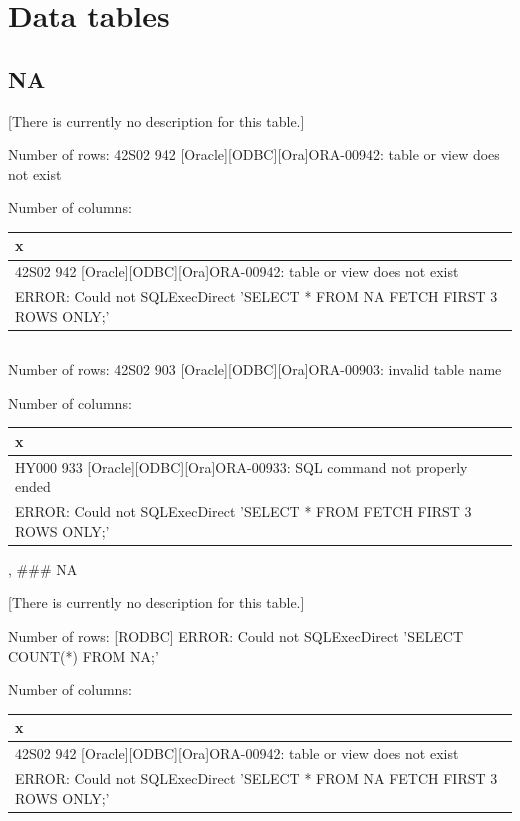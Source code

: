 \documentclass[
  letterpaper,
  oneside,
  open=any]{scrbook}
\begin{document}
\hypertarget{data-tables-1}{%
\section{Data tables}\label{data-tables-1}}

\hypertarget{na-1}{%
\subsection{NA}\label{na-1}}

{[}There is currently no description for this table.{]}

Number of rows: 42S02 942 {[}Oracle{]}{[}ODBC{]}{[}Ora{]}ORA-00942:
table or view does not exist

Number of columns:

\begin{tabular}{l}
\hline
x\\
\hline
42S02 942 [Oracle][ODBC][Ora]ORA-00942: table or view does not exist\\
\hline
[RODBC] ERROR: Could not SQLExecDirect 'SELECT *
    FROM NA
    FETCH FIRST 3 ROWS ONLY;'\\
\hline
\end{tabular}

\hypertarget{section-306}{%
\subsection{}\label{section-306}}

Number of rows: 42S02 903 {[}Oracle{]}{[}ODBC{]}{[}Ora{]}ORA-00903:
invalid table name

Number of columns:

\begin{tabular}{l}
\hline
x\\
\hline
HY000 933 [Oracle][ODBC][Ora]ORA-00933: SQL command not properly ended\\
\hline
[RODBC] ERROR: Could not SQLExecDirect 'SELECT *
    FROM 
    FETCH FIRST 3 ROWS ONLY;'\\
\hline
\end{tabular}

, \#\#\# NA

{[}There is currently no description for this table.{]}

Number of rows: {[}RODBC{]} ERROR: Could not SQLExecDirect 'SELECT
COUNT(*) FROM NA;'

Number of columns:

\begin{tabular}{l}
\hline
x\\
\hline
42S02 942 [Oracle][ODBC][Ora]ORA-00942: table or view does not exist\\
\hline
[RODBC] ERROR: Could not SQLExecDirect 'SELECT *
    FROM NA
    FETCH FIRST 3 ROWS ONLY;'\\
\hline
\end{tabular}
\end{document}
